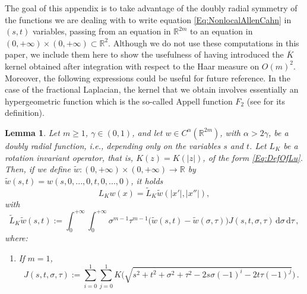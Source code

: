 \documentclass[12pt,reqno]{amsart}
\newtheorem{lemma}[theorem]{Lemma}
\theoremstyle{definition}
\theoremstyle{remark}
\newcommand{\con}[1]{\mathbb{#1}}
\newcommand{\R}{\con{R}} %
\newcommand{\Sph}{\con{S}} %
\newcommand{\s}{\gamma}
\renewcommand{\d}{\,\mathrm{d}} %
\numberwithin{equation}{section}
\begin{document}
The goal of this appendix is to take advantage of the doubly radial symmetry of the functions we are dealing with to write equation \eqref{Eq:NonlocalAllenCahn} in $(s,t)$ variables, passing from an equation in $\R^{2m}$ to an equation in $(0,+\infty)\times (0,+\infty)\subset \R^2$. Although we do not use these computations in this paper, we include them here to show the usefulness of having introduced the $\overline{K}$ kernel obtained after integration with respect to the Haar measure on $O(m)^2$. Moreover, the following expressions could be useful for future reference. In the case of the fractional Laplacian, the kernel that we obtain involves essentially an hypergeometric function which is the so-called Appell function $F_2$ (see \cite{Appell} for its definition).

\begin{lemma}
	\label{Lemma:OperatorInSTVariables} Let $m \geq 1$, $\s\in(0,1)$, and let $w\in
	C^\alpha(\R^{2m})$, with $\alpha > 2\s$, be a doubly radial function, i.e., depending only on the variables $s$ and $t$. Let $L_K$ be a rotation invariant operator, that is, $K(z) = K(|z|)$, of the form \eqref{Eq:DefOfLu}. Then, if we define $\tilde{w}:(0,+\infty)\times (0,+\infty) \to \R$ by $\tilde{w}(s,t) = w(s,0,...,0,t,0,...,0)$, it holds
	$$ L_Kw(x) = \tilde{L}_K \tilde{w} (|x'|,|x''|), $$
	with
	\begin{equation*}
	\label{Eq:OperatorInSTVariables}
	\widetilde{L}_K \tilde{w} (s,t) := \int_0^{+\infty}  \int_0^{+\infty} \sigma^{m-1} \tau^{m-1} \big(\tilde{w}(s,t) - \tilde{w}(\sigma, \tau)\big) J(s,t,\sigma, \tau)  \d \sigma\d \tau\,,
	\end{equation*}
	where:
	\begin{enumerate}
		\item If $m= 1$,
		\begin{equation}
		\label{Eq:KernelSTVariables1}
		J(s,t,\sigma, \tau) := \sum_{i=0}^1  \sum_{j =0}^1  K\Big(\sqrt{s^2 + t^2 + \sigma^2 + \tau^2 -2 s \sigma (-1)^i -2 t \tau (-1)^j}\Big)\,.
		\end{equation}
		

\end{enumerate}
\end{lemma}
\end{document}
